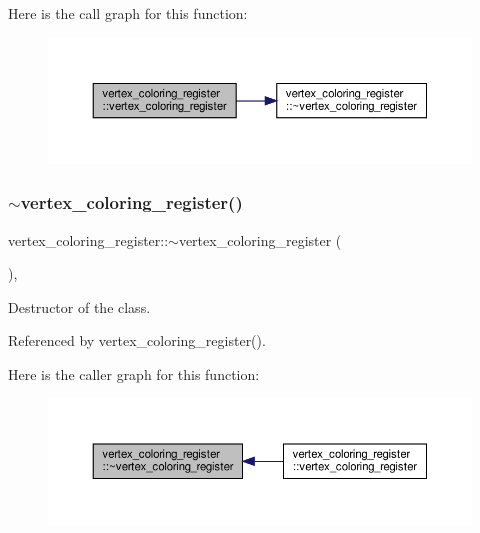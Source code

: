 Here is the call graph for this function\+:
\nopagebreak
\begin{figure}[H]
\begin{center}
\leavevmode
\includegraphics[width=350pt]{d4/d36/classvertex__coloring__register_a36703a7515462e2608596f8f0dc9d0d1_cgraph}
\end{center}
\end{figure}
\mbox{\label{classvertex__coloring__register_aa01f4afa797a1792c1b7389642cbfdfe}} 
\subsubsection{\texorpdfstring{$\sim$vertex\+\_\+coloring\+\_\+register()}{~vertex\_coloring\_register()}}
{\footnotesize\ttfamily vertex\+\_\+coloring\+\_\+register\+::$\sim$vertex\+\_\+coloring\+\_\+register (\begin{DoxyParamCaption}{ }\end{DoxyParamCaption})\hspace{0.3cm}{\ttfamily [override]}, {\ttfamily [default]}}



Destructor of the class. 



Referenced by vertex\+\_\+coloring\+\_\+register().

Here is the caller graph for this function\+:
\nopagebreak
\begin{figure}[H]
\begin{center}
\leavevmode
\includegraphics[width=350pt]{d4/d36/classvertex__coloring__register_aa01f4afa797a1792c1b7389642cbfdfe_icgraph}
\end{center}
\end{figure}



